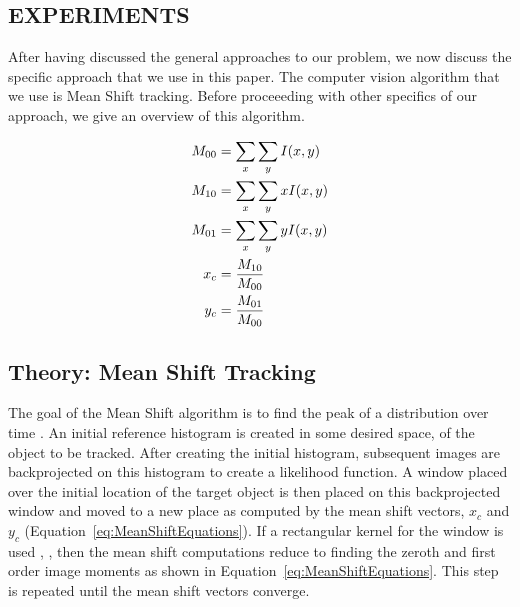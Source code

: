 \documentclass{article}
\begin{document}
\begin{itemize}


\section{EXPERIMENTS}
After having discussed the general approaches to our problem, we now discuss the specific approach that we use in this paper.  The computer vision algorithm that we use is Mean Shift tracking.  Before proceeeding with other specifics of our approach, we give an overview of this algorithm.

\begin{align}
	\label{eq:MeanShiftEquations}
	M_{00}&=\sum_x\sum_yI(x,y)\notag\\
	M_{10}&=\sum_x\sum_yxI(x,y)\notag\\
	M_{01}&=\sum_x\sum_yyI(x,y)\\
	x_c&=\frac{M_{10}}{M_{00}}\notag \\
	y_c&=\frac{M_{01}}{M_{00}} \notag
\end{align}

\subsection{Theory: Mean Shift Tracking}
The goal of the Mean Shift algorithm is to find the peak of a distribution over time  \cite{2003_JNL_TRKkernel_Comaniciu}.  An initial reference histogram is created in some desired space, of the object to be tracked.   After creating the initial histogram, subsequent images are backprojected on this histogram to create a likelihood function.  A window placed over the initial location of the target object is then placed on this backprojected window and moved to a new place as computed by the mean shift vectors, $x_c$ and $y_c$ (Equation~\ref{eq:MeanShiftEquations}).  If a rectangular kernel for the window is used \cite{1998_JNL_FaceObjectTracking_Bradski}, \cite{2008_BOOK_OpenCV_Bradski}, then the mean shift computations reduce to finding the zeroth and first order image moments as shown in Equation~\ref{eq:MeanShiftEquations}.  This step is repeated until the mean shift vectors converge.  


\end{itemize}
\end{document}
